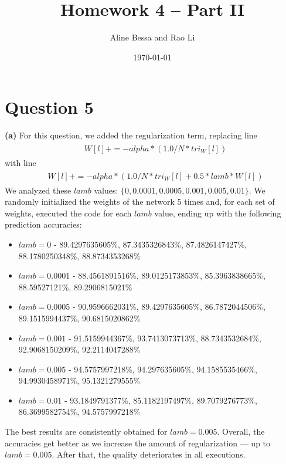 \documentclass[leqno]{article}
\title{Homework 4 -- Part II}
\author{Aline Bessa and Rao Li}
\date\today
\begin{document}
\maketitle %

\section*{Question 5} \textbf{(a)} For this question, we added the regularization term, replacing line
\begin{gather*}
\begin{split}
&W[l] += -alpha * (1.0/N * tri_W[l])
\end{split}
\end{gather*}
with line
\begin{gather*}
\begin{split}
&W[l] += -alpha * (1.0/N * tri_W[l] + 0.5 * lamb * W[l])
\end{split}
\end{gather*}
We analyzed these $lamb$ values: $\{0, 0.0001, 0.0005, 0.001, 0.005, 0.01\}$.
We randomly initialized the weights of the network 5 times and, for each set of weights, executed the code for each $lamb$ value, ending up with the following 
prediction accuracies:
\begin{itemize}
\item $lamb = 0$ - 89.4297635605\%, 87.3435326843\%, 87.4826147427\%, 88.1780250348\%, 88.8734353268\%
\item $lamb = 0.0001$ - 88.4561891516\%, 89.0125173853\%, 85.3963838665\%, 88.59527121\%, 89.2906815021\%
\item $lamb = 0.0005$ - 90.9596662031\%, 89.4297635605\%, 86.7872044506\%, 89.1515994437\%, 90.6815020862\%
\item $lamb = 0.001$ - 91.5159944367\%, 93.7413073713\%, 88.7343532684\%, 92.9068150209\%, 92.2114047288\%
\item $lamb = 0.005$ - 94.5757997218\%, 94.297635605\%, 94.1585535466\%, 94.9930458971\%, 95.1321279555\%
\item $lamb = 0.01$ - 93.1849791377\%, 85.1182197497\%, 89.7079276773\%, 86.3699582754\%, 94.5757997218\% 
\end{itemize} 
The best results are consistently obtained for $lamb = 0.005$. Overall, the accuracies get better as we increase the amount of regularization --- up to $lamb = 0.005$.
After that, the quality  deteriorates in all executions.  
\end{document}
